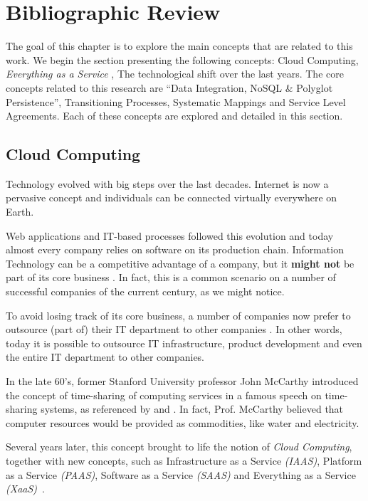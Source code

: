 \chapter{Bibliographic Review}

The goal of this chapter is to explore the main concepts that are related to this work. We begin the section presenting the following concepts: Cloud Computing, \textit{Everything as a Service} , The technological shift over the last years. The core concepts related to this research are ``Data Integration, NoSQL \& Polyglot Persistence'', Transitioning Processes, Systematic Mappings and Service Level Agreements. Each of these concepts are explored and detailed in this section.

\section{Cloud Computing}

Technology evolved with big steps over the last decades. Internet is now a pervasive concept and individuals can be connected virtually everywhere on Earth. \cite{Armbrust09m.:above}

Web applications and IT-based processes followed this evolution and today almost every company relies on software on its production chain. Information Technology can be a competitive advantage of a company, but it \textbf{might not}  be part of its core business \cite{powell1997information}. In fact, this is a common scenario on a number of successful companies of the current century, as we might notice.

To avoid losing track of its core business, a number of companies now prefer to outsource (part of) their IT department to other companies \cite{quinn2013technology}. In other words, today it is possible to outsource IT infrastructure, product development and even the entire IT department to other companies.

In the late 60's, former Stanford University professor John McCarthy introduced the concept of time-sharing of computing services in a famous speech on time-sharing systems, as referenced by \cite{brendon} and \cite{wiki:mccarthy}. In fact, Prof. McCarthy believed that computer resources would be provided as commodities, like water and electricity.

Several years later, this concept brought to life the notion of \textit{Cloud Computing}, together with new concepts, such as Infrastructure as a Service \textit{(IAAS)}, Platform as a Service \textit{(PAAS)}, Software as a Service \textit{(SAAS)} and Everything as a Service \textit{(XaaS)}~\cite{AViewOfCloudComputing}.

